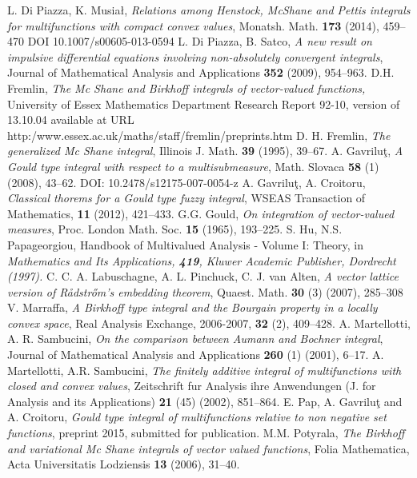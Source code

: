 \documentclass[11pt,a4paper,twoside]{amsart}
\begin{document}
\begin{thebibliography}{99}
 L. Di Piazza,  K.  Musia\l,   \textit{Relations among Henstock, McShane and Pettis
integrals for multifunctions with compact convex values}, Monatsh. Math.  \textbf{173} (2014), 459--470
DOI 10.1007/s00605-013-0594 
 L. Di Piazza, B. Satco,  \textit{A new result on impulsive differential equations involving non-absolutely
convergent integrals},  Journal of Mathematical Analysis and Applications \textbf{352}  (2009), 954--963.
 D.H. Fremlin,   \textit{The Mc Shane and Birkhoff integrals of vector-valued functions,} University of Essex Mathematics Department
Research Report 92-10, version of 13.10.04 available at URL
http:/www.essex.ac.uk/maths/staff/fremlin/preprints.htm
 D. H. Fremlin,   {\it The generalized Mc Shane integral}, Illinois J. Math. {\bf 39} (1995), 39--67.
 A. Gavrilu\c{t},  \textit{A Gould type integral with respect to a multisubmeasure}, Math. Slovaca {\bf 58} (1)  (2008), 43--62. DOI: 10.2478/s12175-007-0054-z
 A. Gavrilu\c{t}, A. Croitoru,   \textit{Classical thorems for a Gould type fuzzy integral}, WSEAS Transaction of Mathematics, {\bf 11} (2012), 421--433.
 G.G. Gould,  \textit{On integration of vector-valued measures}, Proc. London Math. Soc. {\bf 15} (1965), 193--225.
 S. Hu, N.S. Papageorgiou,   {Handbook of Multivalued  Analysis - Volume I: Theory, in \rm \em  Mathematics and Its Applications, {\bf 419}, Kluwer Academic Publisher, \rm Dordrecht  (1997).}
 C. C. A. Labuschagne,  A. L. Pinchuck, C. J. van Alten,  {\em A vector lattice version of R{\aa}dstr\H{o}m's embedding theorem},  Quaest. Math. \textbf{30} (3) (2007), 285--308
 V. Marraffa,   \textit{A Birkhoff type integral and the Bourgain property in a locally convex space}, Real Analysis Exchange, 2006-2007, {\bf 32} (2), 409--428.
  A. Martellotti,   A. R. Sambucini,  \textit{ On the comparison between Aumann and Bochner integral}, Journal of Mathematical Analysis and Applications {\bf 260} (1) (2001), 6--17. 
 A. Martellotti,   A.R. Sambucini,  \textit{The finitely additive integral of multifunctions with closed and convex values}, Zeitschrift fur Analysis ihre Anwendungen (J. for Analysis and its Applications) {\bf 21} (45) (2002), 851--864. 
 E. Pap, A. Gavrilu\c{t} and A. Croitoru,  \textit{Gould type integral of multifunctions relative to non negative set functions}, preprint 2015, submitted for publication.
 M.M. Potyrala,  \textit{The Birkhoff and variational Mc Shane integrals of vector valued functions}, Folia Mathematica, Acta Universitatis Lodziensis {\bf 13} (2006), 31--40.

\end{thebibliography}
\end{document}
